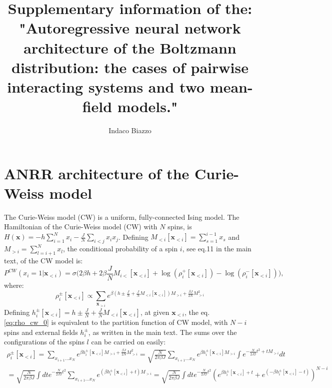 \documentclass[10pt, notitlepage]{revtex4-2}
\begin{document}
\title{Supplementary information of the: "Autoregressive neural network architecture of the Boltzmann distribution: the cases of pairwise interacting systems and two mean-field models."}

\author{Indaco Biazzo}
\maketitle
\tableofcontents

\section{ANRR architecture of the Curie-Weiss model}

The Curie-Weiss model (CW) is a uniform, fully-connected Ising model. The Hamiltonian of the Curie-Weiss model (CW) with $N$ spins, is $H\left(\mathbf{x}\right)=-h\sum_{i=1}^{N}x_{i}-\frac{J}{N}\sum_{i<j}x_{i}x_{j}$. Defining $M_{<i}[\mathbf{x}_{<i}]=\sum_{s=1}^{i-1}x_{s}$ and $M_{>i}=\sum_{l=i+1}^{N}x_{l}$, the conditional probability of a spin $i$, see eq.11 in the main text, of the CW model is:
\begin{equation}
P^{CW}\left(x_{i}=1|\mathbf{x}_{<i}\right) = 
\sigma\bigg( 
 2 \beta h + 2 \beta \frac{J}{N}M_{i<}[\mathbf{x}_{<i}] + %
 \log(\rho_i^+[\mathbf{x}_{<i}]) - \log(\rho_i^-[\mathbf{x}_{<i}])
\bigg),
\label{eq:conditional_cw}
\end{equation}
where:
\begin{equation}
\rho_i^{\pm}[\mathbf{x}_{<i}] \propto \sum_{\mathbf{x}_{>i}}e^{\beta \left(h\pm\frac{J}{N}+\frac{J}{N}M_{<i}[\mathbf{x}_{<i}]\right)M_{>i}+\frac{\beta J}{2N}M_{>i}^{2}} 
\label{eq:rho_cw_0}
\end{equation}
Defining $h_i^{\pm}[\mathbf{x}_{<i}] =h\pm\frac{J}{N}+\frac{J}{N}M_{<i}[\mathbf{x}_{<i}]$, at given $\mathbf{x}_{<i}$, the eq. \ref{eq:rho_cw_0} is equivalent to the partition function of CW model, with $N-i$ spins and external fields $h_i^{\pm}$, as written in the main text. 
The sums over the configurations of the spins $l$ can be carried on easily: 
\begin{multline}
 \rho_i^{\pm}[\mathbf{x}_{<i}] = \sum_{x_{i+1}\dots x_{N}} e^{\beta h_i^{\pm}[\mathbf{x}_{<i}]M_{>i} +\frac{\beta J}{2N}M_{>i}^{2}} = \sqrt{\frac{N}{2\pi \beta J}}\sum_{x_{i+1}\dots x_{N}}e^{\beta h_i^{\pm}[\mathbf{x}_{<i}] M_{>i}}\int e^{-\frac{N}{2J \beta}t^{2}+t M_{>i}} dt\\
  = \sqrt{\frac{N}{2\pi \beta J}}\int dt e^{-\frac{N}{2J \beta}t^{2}} \sum_{x_{i+1}\dots x_{N}}e^{(\beta h_i^{\pm}[\mathbf{x}_{<i}] + t) M_{>i}}  
 =  \sqrt{\frac{N}{2\pi \beta J}}\int dt e^{-\frac{N}{2J \beta}t^{2}} \left(e^{\beta h_i^{\pm}[\mathbf{x}_{<i}] + t} + e^{ (-\beta h_i^{\pm}[\mathbf{x}_{<i}] - t)} \right)^{N-i}  \\ 
 \label{eq:rho_last_exact}
 \end{multline} 
\end{document}
